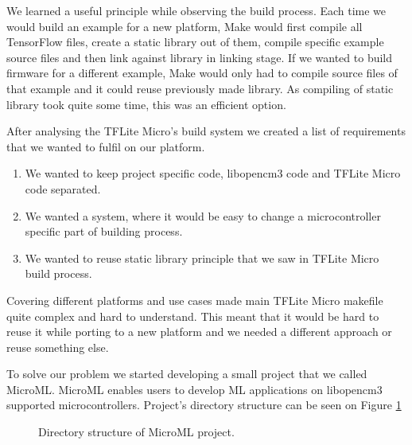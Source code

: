 We learned a useful principle while observing the build process. 
Each time we would build an example for a new platform, Make would first compile all TensorFlow files, create a static library out of them, compile specific example source files and then link against library in linking stage.
If we wanted to build firmware for a different example, Make would only had to compile source files of that example and it could reuse previously made library.
As compiling of static library took quite some time, this was an efficient option.

After analysing the TFLite Micro's build system we created a list of requirements that we wanted to fulfil on our platform.

\begin{enumerate}
    \item We wanted to keep project specific code, libopencm3 code and TFLite Micro code separated.
    \item We wanted a system, where it would be easy to change a microcontroller specific part of building process.
    \item We wanted to reuse static library principle that we saw in TFLite Micro build process.
\end{enumerate}

Covering different platforms and use cases made main TFLite Micro makefile quite complex and hard to understand.
This meant that it would be hard to reuse it while porting to a new platform and we needed a different approach or reuse something else.

To solve our problem we started developing a small project that we called MicroML\footnotemark.
MicroML enables users to develop ML applications on libopencm3 supported microcontrollers.
Project's directory structure can be seen on Figure \ref{microml_dir}


\begin{figure}[ht] 
    \centering
    \begin{minipage}{7cm}
    \end{minipage}
    \caption{ Directory structure of MicroML project.}
    \label{microml_dir}
\end{figure}

